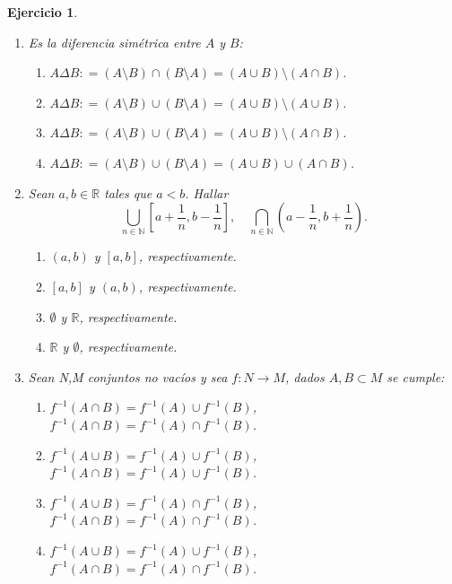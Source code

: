 \documentclass[twoside,12pt,a4 paper,openright]{book}
\newtheorem{ejer}[claim]{Ejercicio}
\begin{document}
\begin{ejer}
\begin{enumerate}
\newpage


\item Es la diferencia sim\'etrica entre $A$ y $B$:
{\small
\begin{enumerate}
\item[\textcolor{red}{$\bullet$}] {}
 $A\Delta B: = (A\setminus  B )\cap (B\setminus A)   = (A\cup B) \setminus (A\cap B)$.
\item[\textcolor{blue}{$\bullet$}] {}
 $A\Delta B: = (A\setminus  B )\cup (B\setminus A)   = (A\cup B) \setminus (A\cup B)$.
 \item[\textcolor{yellow}{$\bullet$}] {}
 $A\Delta B: = (A\setminus  B )\cup (B\setminus A)   = (A\cup B) \setminus (A\cap B)$.
\item[\textcolor{green}{$\bullet$}] {}
 $A\Delta B: = (A\setminus  B )\cup (B\setminus A)   = (A\cup B) \cup (A\cap B)$.
\end{enumerate}
}



\newpage


\item Sean $a,b\in \mathbb{R}$ tales que $a< b$. Hallar 
$$\displaystyle \bigcup_{n\in \mathbb N} \left[a+\frac{1}{n}, b-\frac{1}{n}\right] , \quad   \displaystyle \bigcap_{n\in \mathbb N} \left(a-\frac{1}{n}, b+\frac{1}{n}\right) .$$
{\small
\begin{enumerate}
\item[\textcolor{red}{$\bullet$}] {}  $(a,b)$ y $[a,b]$, respectivamente.
\item[\textcolor{blue}{$\bullet$}] {}    $[a,b]$ y $(a,b)$, respectivamente.
\item[\textcolor{yellow}{$\bullet$}] {} $\emptyset$ y $\mathbb R$, respectivamente.
\item[\textcolor{green}{$\bullet$}] {} $\mathbb R$ y $\emptyset$, respectivamente.
\end{enumerate}
}


\newpage


\item     Sean N,M conjuntos no vac\'ios y sea $f:N \rightarrow M$, dados $A,B \subset M$ se cumple:
{\small
\begin{enumerate}
\item[\textcolor{red}{$\bullet$}] {}
     $f^{-1}(A \cap B) = f^{-1}(A) \cup f^{-1}(B)$, \ \ \ $f^{-1}(A \cap B) = f^{-1}(A) \cap f^{-1}(B)$.
\item[\textcolor{blue}{$\bullet$}] {}
     $f^{-1}(A \cup B) = f^{-1}(A) \cup f^{-1}(B)$, \ \ \ $f^{-1}(A \cap B) = f^{-1}(A) \cup f^{-1}(B)$.
\item[\textcolor{yellow}{$\bullet$}] {}
     $f^{-1}(A \cup B) = f^{-1}(A) \cap f^{-1}(B)$, \ \ \ $f^{-1}(A \cap B) = f^{-1}(A) \cap f^{-1}(B)$.
\item[\textcolor{green}{$\bullet$}] {}
     $f^{-1}(A \cup B) = f^{-1}(A) \cup f^{-1}(B)$, \ \ \ $f^{-1}(A \cap B) = f^{-1}(A) \cap f^{-1}(B)$.
\end{enumerate}
}
     

\end{enumerate}
\end{ejer}
\end{document}
